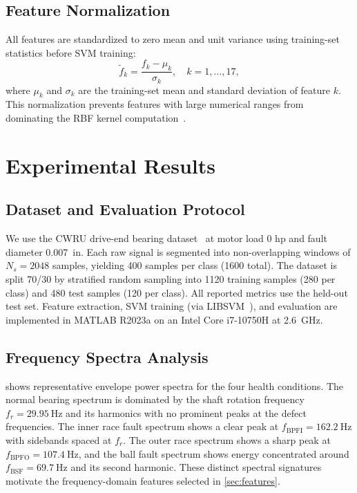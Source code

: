\documentclass[conference,a4paper]{IEEEtran}[2015/08/26]
\begin{document}
\subsection{Feature Normalization}

All features are standardized to zero mean and unit variance using
training-set statistics before SVM training:
\begin{equation}
  \tilde{f}_k = \frac{f_k - \mu_k}{\sigma_k},
  \quad k = 1, \ldots, 17,
  \label{eq:norm}
\end{equation}
where $\mu_k$ and $\sigma_k$ are the training-set mean and standard
deviation of feature $k$. This normalization prevents features with
large numerical ranges from dominating the RBF kernel
computation~\cite{Scholkopf2002}.

\section{Experimental Results}
\label{sec:exp}

\subsection{Dataset and Evaluation Protocol}

We use the CWRU drive-end bearing dataset~\cite{Loparo2003,Smith2015}
at motor load 0 hp and fault diameter \SI{0.007}{in}. Each raw signal
is segmented into non-overlapping windows of $N_s = 2048$ samples,
yielding 400 samples per class (1600 total). The dataset is split 70/30
by stratified random sampling into 1120 training samples (280 per class)
and 480 test samples (120 per class). All reported metrics use the held-out
test set. Feature extraction, SVM training (via LIBSVM~\cite{Chang2011}),
and evaluation are implemented in MATLAB R2023a on an Intel Core i7-10750H
at \SI{2.6}{\giga\hertz}.

\subsection{Frequency Spectra Analysis}

 shows representative envelope power spectra for the
four health conditions. The normal bearing spectrum is dominated by the
shaft rotation frequency $f_r = \SI{29.95}{\hertz}$ and its harmonics
with no prominent peaks at the defect frequencies. The inner race fault
spectrum shows a clear peak at $f_{\text{BPFI}} = \SI{162.2}{\hertz}$
with sidebands spaced at $f_r$. The outer race spectrum shows a sharp
peak at $f_{\text{BPFO}} = \SI{107.4}{\hertz}$, and the ball fault
spectrum shows energy concentrated around $f_{\text{BSF}} = \SI{69.7}{\hertz}$
and its second harmonic. These distinct spectral signatures motivate the
frequency-domain features selected in \cref{sec:features}.
\end{document}

